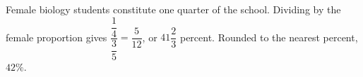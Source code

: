 Female biology students constitute one quarter of the school. Dividing by the female proportion gives $\dfrac{\dfrac{1}{4}}{\dfrac{3}{5}}=\dfrac{5}{12}$, or $41\dfrac{2}{3}$ percent. Rounded to the nearest percent, $\boxed{42\%}$.
